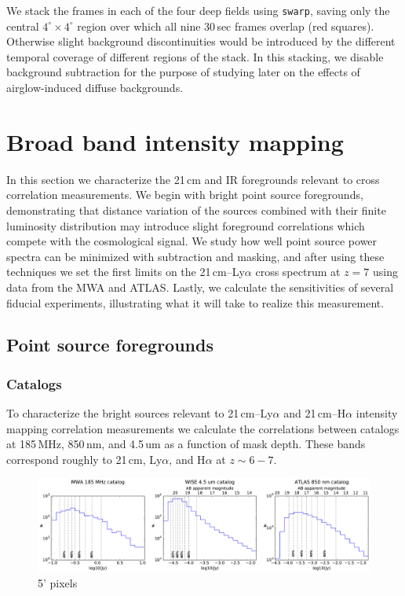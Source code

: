 \documentclass[preprint]{aastex}
\begin{document}
We stack the frames in each of the four deep fields using {\tt swarp}, saving only the central $4^\circ\times 4^\circ$ region over which all nine 30\,sec frames overlap (red squares). Otherwise slight background discontinuities would be introduced by the different temporal coverage of different regions of the stack. In this stacking, we disable background subtraction for the purpose of studying later on the effects of airglow-induced diffuse backgrounds.

\section{Broad band intensity mapping}

In this section we characterize the 21\,cm and IR foregrounds relevant to cross correlation measurements. We begin with bright point source foregrounds, demonstrating that distance variation of the sources combined with their finite luminosity distribution may introduce slight foreground correlations which compete with the cosmological signal. We study how well point source power spectra can be minimized with subtraction and masking, and after using these techniques we set the first limits on the 21\,cm--Ly$\alpha$ cross spectrum at $z=7$ using data from the MWA and ATLAS. Lastly, we calculate the sensitivities of several fiducial experiments, illustrating what it will take to realize this measurement.

\subsection{Point source foregrounds}

\subsubsection{Catalogs}

To characterize the bright sources relevant to 21\,cm--Ly$\alpha$ and  21\,cm--H$\alpha$ intensity mapping correlation measurements we calculate the correlations between catalogs at 185\,MHz, 850\,nm, and 4.5\,um as a function of mask depth. These bands correspond roughly to 21\,cm, Ly$\alpha$, and H$\alpha$ at $z\sim6-7$. 

\begin{figure}[h]
\centering
\includegraphics[width=6.5in]{images/catalog_histograms.pdf}
\caption{5' pixels}
\label{fig:cataloghistograms}
\end{figure}
\end{document}
